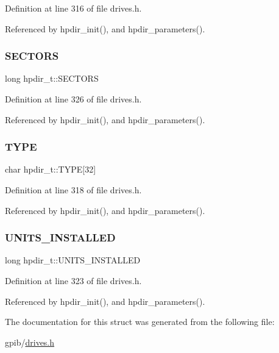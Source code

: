 Definition at line 316 of file drives.\+h.



Referenced by hpdir\+\_\+init(), and hpdir\+\_\+parameters().

\mbox{\label{structhpdir__t_a6ee950a83086b3872cfd8fab8d809bf2}} 
\subsubsection{\texorpdfstring{S\+E\+C\+T\+O\+RS}{SECTORS}}
{\footnotesize\ttfamily long hpdir\+\_\+t\+::\+S\+E\+C\+T\+O\+RS}



Definition at line 326 of file drives.\+h.



Referenced by hpdir\+\_\+init(), and hpdir\+\_\+parameters().

\mbox{\label{structhpdir__t_ad2f925b088d4fd746c9ea789f34f9507}} 
\subsubsection{\texorpdfstring{T\+Y\+PE}{TYPE}}
{\footnotesize\ttfamily char hpdir\+\_\+t\+::\+T\+Y\+PE\mbox{[}32\mbox{]}}



Definition at line 318 of file drives.\+h.



Referenced by hpdir\+\_\+init(), and hpdir\+\_\+parameters().

\mbox{\label{structhpdir__t_a748150d5e0351e2d827f2a4def385ca9}} 
\subsubsection{\texorpdfstring{U\+N\+I\+T\+S\+\_\+\+I\+N\+S\+T\+A\+L\+L\+ED}{UNITS\_INSTALLED}}
{\footnotesize\ttfamily long hpdir\+\_\+t\+::\+U\+N\+I\+T\+S\+\_\+\+I\+N\+S\+T\+A\+L\+L\+ED}



Definition at line 323 of file drives.\+h.



Referenced by hpdir\+\_\+init(), and hpdir\+\_\+parameters().



The documentation for this struct was generated from the following file\+:\begin{DoxyCompactItemize}
\item 
gpib/\hyperlink{drives_8h}{drives.\+h}\end{DoxyCompactItemize}
